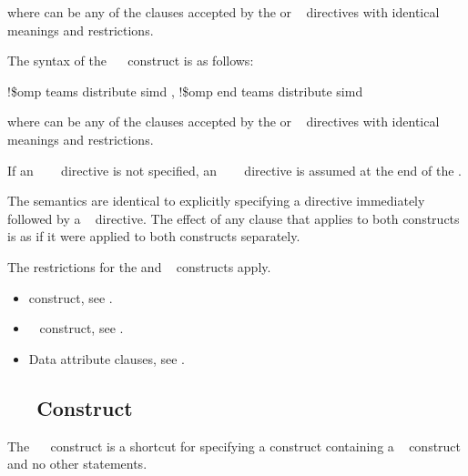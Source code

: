 {{{{where  can be any of the clauses accepted by the  or ~ 
directives with identical meanings and restrictions.
\ccppspecificend

\fortranspecificstart
The syntax of the ~~ construct is as follows:

\begin{boxedcode}
!\$omp teams distribute simd \plc{[clause[ [},\plc{] clause] ... ]}
\plc{[}!\$omp end teams distribute simd\plc{]}
\end{boxedcode}

where  can be any of the clauses accepted by the  or ~ 
directives with identical meanings and restrictions.

If an ~~~ directive is 
not specified, an ~~~ 
directive is assumed at the end of the .
\fortranspecificend

\descr
The semantics are identical to explicitly specifying a  directive immediately 
followed by a ~ directive. The effect of any clause that applies to both constructs is as if it were applied to both constructs separately.


\restrictions
The restrictions for the  and ~ constructs apply.

\crossreferences
\begin{itemize}
\item {} construct, see 
.

\item {}~ construct, see 
.

\item Data attribute clauses, see 
.
\end{itemize}











\subsection{~~ Construct}
\label{subsec:target teams distribute construct}
\summary
The ~~ construct is a shortcut for specifying a  construct 
containing a ~ construct and no other statements.

}}}}
